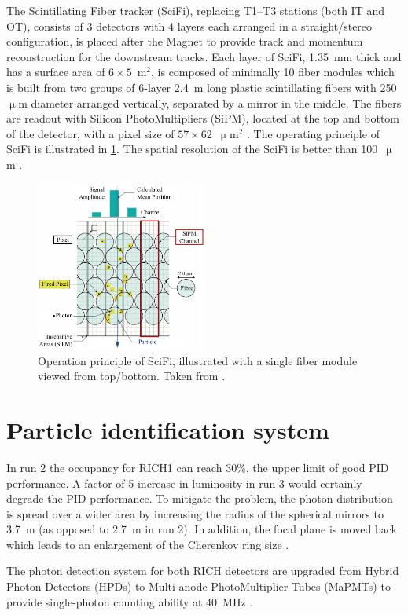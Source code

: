The Scintillating Fiber tracker (SciFi),
replacing T1--T3 stations (both IT and OT),
consists of 3 detectors with 4 layers each arranged in a straight/stereo
configuration,
is placed after the Magnet to provide track and momentum reconstruction for the
downstream tracks.
Each layer of SciFi,
1.35~mm thick and has a surface area of $6 \times 5$~m$^2$,
is composed of minimally 10 fiber modules
which is built from two groups of 6-layer 2.4~m long plastic scintillating
fibers with 250~$\upmu$m diameter arranged vertically,
separated by a mirror in the middle.
The fibers are readout with Silicon PhotoMultipliers (SiPM), located at the top
and bottom of the detector,
with a pixel size of $57 \times 62$~$\upmu$m$^2$
\cite{Piucci_2017,Massafferri_2020}.
The operating principle of SciFi is illustrated in \cref{fig:scifi-op}.
The spatial resolution of the SciFi is better than 100~$\upmu$m
\cite{Massafferri_2020}.

\begin{figure}[!htb]
    \centering
    \includegraphics[width=0.5\textwidth]{./figs-lhcb-upgrade-overview/tracking/scifi_op_principle.pdf}
    \caption{
        Operation principle of SciFi,
        illustrated with a single fiber module viewed from top/bottom.
        Taken from \cite{Berninghoff:2810671}.
    }
    \label{fig:scifi-op}
\end{figure}


\section{Particle identification system}
\label{ref:lhcb-upgrade-overview:pid}

In run 2 the occupancy for RICH1 can reach 30\%,
the upper limit of good PID performance.
A factor of 5 increase in luminosity in run 3 would certainly degrade the PID
performance.
To mitigate the problem,
the photon distribution is spread over a wider area by increasing the
radius of the spherical mirrors to 3.7~m (as opposed to 2.7~m in run 2).
In addition, the focal plane is moved back which leads to an enlargement
of the Cherenkov ring size
\cite{D_Ambrosio_2017,Okamura:2837863}.

The photon detection system for both RICH detectors are upgraded from
Hybrid Photon Detectors (HPDs) to Multi-anode PhotoMultiplier Tubes (MaPMTs)
to provide single-photon counting ability at 40~MHz
\cite{Okamura:2837863}.
